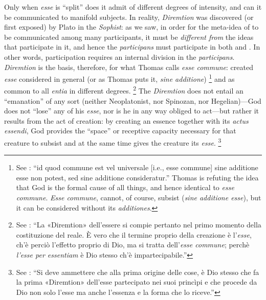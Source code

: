 Only when \emph{esse} is ``split'' does it admit of different degrees of intensity, and can it be communicated to manifold subjects. In reality, \emph{Diremtion} was discovered (or first exposed) by Plato in the \emph{Sophist}: as we saw, in order for the meta-idea of  to be communicated among many participants, it must be \emph{different from} the ideas that participate in it, and hence the \emph{participans} must participate in both  and . In other words, participation requires an internal division in the \emph{participans}. \emph{Diremtion} is the basis, therefore, for what Thomas calls \emph{esse commune}: created \emph{esse} considered in general (or as Thomas puts it, \emph{sine additione})%
%
\footnote{See \cite[I, cap.~26, n.~11 (Marietti n.~247)]{st:contragent}: ``id quod commune est vel universale [i.e., esse commune] sine additione esse non potest, sed sine additione consideratur.'' Thomas is refuting the idea that God is the formal cause of all things, and hence identical to \emph{esse commune}. \emph{Esse commune}, cannot, of course, subsist (\emph{sine additione esse}), but it can be considered without its \emph{additiones}.} and as common to all \emph{entia} in different degrees.%
%
\footnote{See \cite[379]{fabro:partecipazione}: ``La «Diremtion» dell'essere si compie pertanto nel primo momento della costituzione del reale. È vero che il termine proprio della creazione è l'\emph{esse}, ch'è perciò l'effetto proprio di Dio, ma si tratta dell'\emph{esse commune}; perchè \emph{l'esse per essentiam} è Dio stesso ch'è impartecipabile.''} The \emph{Diremtion} does not entail an ``emanation'' of any sort (neither Neoplatonist, nor Spinozan, nor Hegelian)---God does not ``lose'' any of his \emph{esse}, nor is he in any way obliged to act---but rather it results from the act of creation: by creating an essence together with its \emph{actus essendi}, God provides the ``space'' or receptive capacity necessary for that creature to subsist and at the same time gives the creature its \emph{esse}.%
%
\footnote{See \cite[366]{fabro:partecipazione}: ``Si deve ammettere che alla prima origine delle cose, è Dio stesso che fa la prima «Diremtion» dell'esse partecipato nei suoi princìpi e che procede da Dio non solo l'esse ma anche l'essenza e la forma che lo riceve.''} 
%

